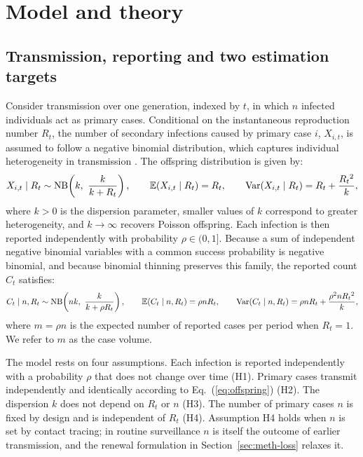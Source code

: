 \section{Model and theory}
\label{sec:background}

\subsection{Transmission, reporting and two estimation targets}
\label{sec:bg-model}

Consider transmission over one generation, indexed by $t$, in which $n$ infected individuals act as primary cases. Conditional on the instantaneous reproduction number $R_t$, the number of secondary infections caused by primary case $i$, $X_{i,t}$, is assumed to follow a negative binomial distribution, which captures individual heterogeneity in transmission \citep{lloydsmith2005superspreading}. The offspring distribution is given by:
\begin{equation}
  X_{i,t}\mid R_t \sim \mathrm{NB}\!\left(k,\ \frac{k}{k+R_t}\right),\qquad
  \mathbb{E}(X_{i,t}\mid R_t)=R_t,\qquad \mathrm{Var}(X_{i,t}\mid R_t)=R_t+\frac{R_t{}^2}{k},
  \label{eq:offspring}
\end{equation}
where $k>0$ is the dispersion parameter, smaller values of $k$ correspond to greater heterogeneity, and $k\to\infty$ recovers Poisson offspring. Each infection is then reported independently with probability $\rho\in(0,1]$. Because a sum of independent negative binomial variables with a common success probability is negative binomial, and because binomial thinning preserves this family, the reported count $C_t$ satisfies:
\begin{equation}
  C_t\mid n,R_t \sim \mathrm{NB}\!\left(nk,\ \frac{k}{k+\rho R_t}\right),\qquad
  \mathbb{E}(C_t\mid n,R_t)=\rho nR_t,\qquad
  \mathrm{Var}(C_t\mid n,R_t)=\rho nR_t+\frac{\rho^2nR_t{}^2}{k},
  \label{eq:observed}
\end{equation}
where $m=\rho n$ is the expected number of reported cases per period when $R_t=1$. We refer to $m$ as the case volume.

The model rests on four assumptions. Each infection is reported independently with a probability $\rho$ that does not change over time (H1). Primary cases transmit independently and identically according to Eq.~(\ref{eq:offspring}) (H2). The dispersion $k$ does not depend on $R_t$ or $n$ (H3). The number of primary cases $n$ is fixed by design and is independent of $R_t$ (H4). Assumption H4 holds when $n$ is set by contact tracing; in routine surveillance $n$ is itself the outcome of earlier transmission, and the renewal formulation in Section~\ref{sec:meth-loss} relaxes it.

